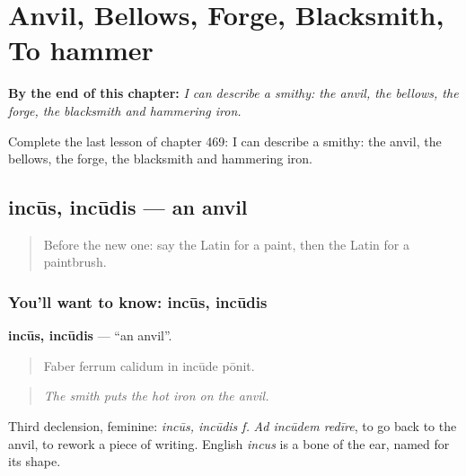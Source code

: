 
\chapter{Anvil, Bellows, Forge, Blacksmith, To hammer}
\label{ch:la-anvil-bellows-forge-blacksmith-to-hammer}

\begin{chapteropening}
\textbf{By the end of this chapter:} \emph{I can describe a smithy: the anvil, the bellows, the forge, the blacksmith and hammering iron.}

Complete the last lesson of chapter 469: I can describe a smithy: the anvil, the bellows, the forge, the blacksmith and hammering iron.
\end{chapteropening}

\section[incūs, incūdis]{incūs, incūdis — an anvil}

\label{lesson:LA-C469-incus}



\begin{quote}
Before the new one: say the Latin for a paint, then the Latin for a paintbrush.
\end{quote}

\subsection*{You'll want to know: incūs, incūdis}
\textbf{incūs, incūdis} — \textquotedblleft{}an anvil\textquotedblright{}.

\begin{quote}
Faber ferrum calidum in incūde pōnit.
\end{quote}

\begin{quote}
\emph{The smith puts the hot iron on the anvil.}
\end{quote}

Third declension, feminine: \emph{incūs, incūdis f.} \emph{Ad incūdem redīre}, to go back to the anvil, to rework a piece of writing. English \emph{incus} is a bone of the ear, named for its shape.

